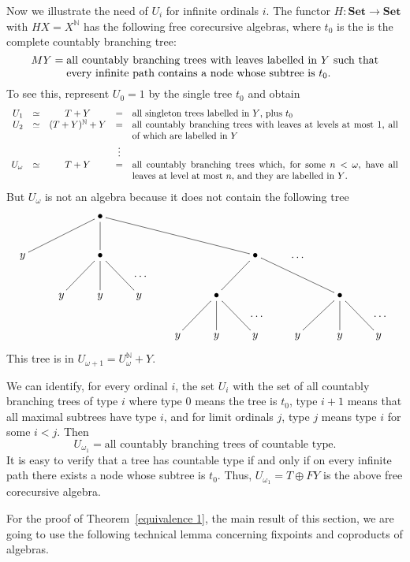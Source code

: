 \documentclass{LMCS}
\theoremstyle{plain}
\theoremstyle{definition}
\numberwithin{equation}{section}
\begin{document}
\begin{exa}
Now we illustrate the need of $U_i$ for infinite ordinals $i$. The
functor $H:\mathbf{ Set}\rightarrow \mathbf{ Set}$ with
$HX=X^{\mathbb{N}}$ has the following free corecursive algebras, where
$t_0$ is the is the complete countably branching tree:
\[
MY =
\parbox[t]{10cm}{all countably branching trees with leaves
labelled in $Y$ such that every infinite path contains a node whose
subtree is $t_0$.}
\]
To see this, represent $U_0=1$ by the single tree $t_0$ and obtain
\[\begin{array}{rcccp{10cm}}
 U_1&\simeq& T+Y&=& all singleton trees labelled in $Y$, plus $t_0$ \\
U_2&\simeq& (T+Y)^\mathbb{N}+Y&=& all countably branching trees with
leaves at levels at most $1$, all of which are labelled in $Y$\\
&&&\vdots\notag\\
U_\omega &\simeq &T+Y&=&
all countably branching trees which, for some $n< \omega$, have all leaves at level at most $n$, and they are labelled in $Y$.
\end{array}\]
 But $U_\omega$ is not an algebra because it does not contain the following tree
 $$
 \xymatrix{
 &&\bullet\ar@{-}[lld]\ar@{-}[d]\ar@{-}[rrrrd]\\
 y&&\bullet\ar@{-}[ld]\ar@{-}[d]\ar@{-}[rd]^(.7)*+{\ldots}&&&&\bullet\ar@{-}[ld]\ar@{-}[rrd]&\ldots\\
 &y&y&y&&\bullet\ar@{-}[ld]\ar@{-}[d]\ar@{-}[rd]^(.7)*+{\ldots}&&&\bullet\ar@{-}[ld]\ar@{-}[d]\ar@{-}[rd]^(.7)*+{\ldots}\\
 &&&&y&y&y&y&y&y
}
 $$
 This tree is in $U_{\omega+1}=U_\omega^\mathbb{N}+Y$.

 We can identify, for every ordinal $i$, the set $U_i$ with the set of all countably branching trees of type $i$ where type $0$ means the tree is $t_0$, type $i+1$ means that all maximal subtrees have type $i$, and for limit ordinals $j$, type $j$ means type $i$ for some $i<j$. Then
 $$U_{\omega_1}=\text {all countably branching trees of countable type.}$$
 It is easy to verify that a tree has countable type if and only if on every infinite path there exists a node whose subtree is $t_0$. Thus, $U_{\omega_1}=T\oplus FY$ is the above free corecursive algebra.
 \end{exa}

For the proof of Theorem~\ref{equivalence 1}, the main result of this section, we are going to use the following technical lemma concerning fixpoints and coproducts of algebras.
\end{document}
